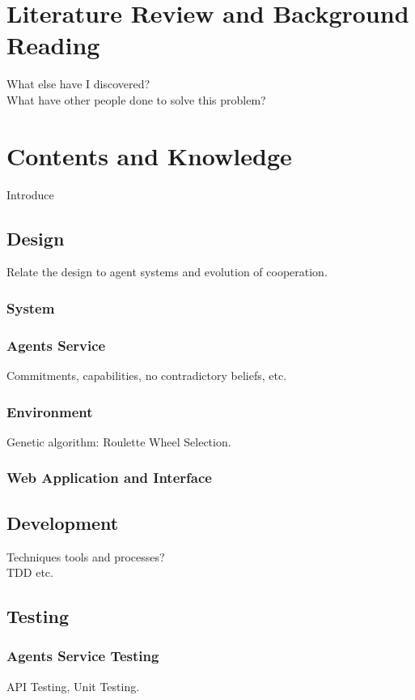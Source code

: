 \documentclass[]{final_report}
\begin{document}
\chapter{Literature Review and Background Reading}
What else have I discovered?\\
What have other people done to solve this problem?~\cite{Mui:2002:NRM:544741.544807}

\chapter{Contents and Knowledge}
Introduce
\section{Design}
Relate the design to agent systems and evolution of cooperation.	
\subsection{System}

\subsection{Agents Service}
Commitments, capabilities, no contradictory beliefs, etc.\\

\subsection{Environment}
Genetic algorithm: Roulette Wheel Selection.\\


\subsection{Web Application and Interface}

\section{Development}
Techniques tools and processes?\\
TDD etc.

\section{Testing}
\subsection{Agents Service Testing}
API Testing, Unit Testing.\\
\end{document}
